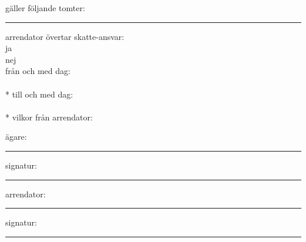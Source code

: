 \documentclass{letter}
\begin{document}
gäller följande tomter:
\vspace*{1cm}
\hrule
arrendator övertar skatte-ansvar:\\
\Square ja\\
\Square nej\\

från och med dag: \\
\\*
till och med dag: \\
\\*
vilkor från arrendator:\\
\vfill


ägare:\\
\vspace*{1cm}
\hrule
signatur:\\
\vspace*{1cm}
\hrule
arrendator:\\
\vspace*{1cm}
\hrule
signatur:\\
\vspace*{1cm}
\hrule
\end{document}
